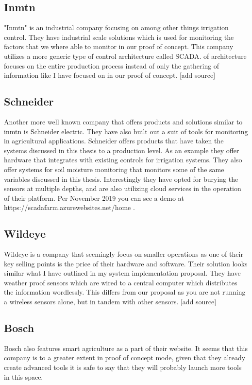 \documentclass[]{uiophd}
\begin{document}
\subsection{Inmtn}
"Inmtn" is an industrial company focusing on among other things irrigation control. They have industrial scale solutions which is used for monitoring the factors that we where able to monitor in our proof of concept. This company utilizes a more generic type of control architecture called SCADA.  of architecture focuses on the entire production process instead of only the gathering of information like I have focused on in our proof of concept. [add source]

\subsection{Schneider}
Another more well known company that offers products and solutions similar to inmtn is Schneider electric. They have also built out a suit of tools for monitoring in agricultural applications. Schneider offers products that have taken the systems discussed in this thesis to a production level. As an example they offer hardware that integrates with existing controls for irrigation systems. They also offer systems for soil moisture monitoring that monitors some of the same variables discussed in this thesis. Interestingly they have opted for burying the sensors at multiple depths, and are also utilizing cloud services in the operation of their platform. Per November 2019 you can see a demo at https://scadafarm.azurewebsites.net/home . 

\subsection{Wildeye}
Wildeye is a company that seemingly focus on smaller operations as one of their key selling points is the price of their hardware and software. Their solution looks similar what I have outlined in my system implementation proposal. They have weather proof sensors which are wired to a central computer which distributes the information wordlessly. This differs from our proposal as you are not running a wireless sensors alone, but in tandem with other sensors. [add source]

\subsection{Bosch}
Bosch also features smart agriculture as a part of their website. It seems that this company is to a greater extent in proof of concept mode, given that they already create advanced tools it is safe to say that they will probably launch more tools in this space.
\end{document}
